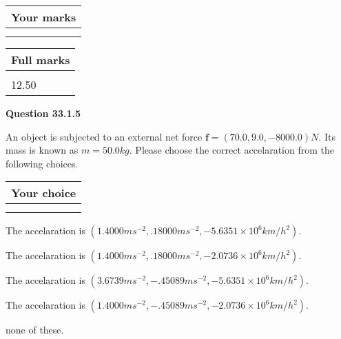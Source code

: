 \documentclass[12pt]{article}
\begin{document}
 

 
 

 
\vspace{0.3in}
  
\vspace{0.2in}
  
         \begin{tabular}{|l|}
\hline
 Your marks  \\
\hline
 \\ 
 \\ 
\hline
\end{tabular}
\hspace{0.05in} \begin{tabular}{|l|}
\hline
 Full marks  \\
\hline
 \\ 
12.50 \\
\hline
\end{tabular}
{\textbf{\Large{Question
33.1.5 
}}}
  
  
 
An object is subjected to an external net force $\mathbf{f}=(
70.0 ,
9.0,
-8000.0  )N$. Its mass is known as
$m= %
50.0  kg$. Please choose the correct accelaration
from the following choices.
 
  
  
\noindent\hspace{3.0in} \begin{tabular}{|l|}
\hline
Your choice \\
\hline
 \\ 
 \\ 
\hline
\end{tabular}
  
  
 
 
The accelaration is
$(
1.4000ms^{-2},
.18000ms^{-2},
-5.6351 \times 10^{6}km/h^2
).
$
 
 
The accelaration is
$(
1.4000ms^{-2},
.18000ms^{-2},
-2.0736 \times 10^{6}km/h^2
).
$
 
 
The accelaration is
$(
3.6739ms^{-2},
-.45089ms^{-2},
-5.6351 \times 10^{6}km/h^2
).
$
 
 
The accelaration is
$(
1.4000ms^{-2},
-.45089ms^{-2},
-2.0736 \times 10^{6}km/h^2
).
$
 
 
none of these.
 
 
 
 
\end{document}
